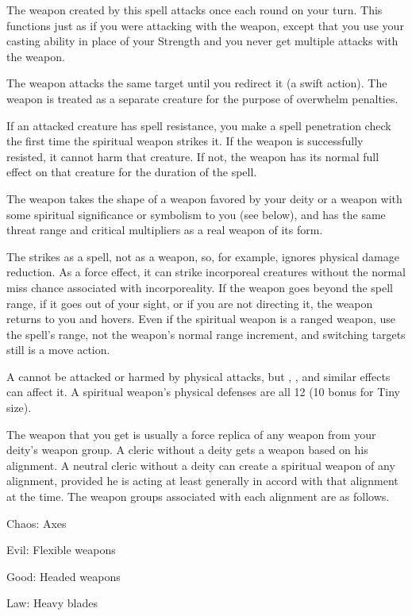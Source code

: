 \spellrng{\rngmed}
\spelldur{\durshort \dismissable}
\begin{spelleffect}
    The weapon created by this spell attacks once each round on your turn. This functions just as if you were attacking with the weapon, except that you use your casting ability in place of your Strength and you never get multiple attacks with the weapon.
    \par The weapon attacks the same target until you redirect it (a swift action). The weapon is treated as a separate creature for the purpose of overwhelm penalties.
    \par If an attacked creature has spell resistance, you make a spell penetration check the first time the spiritual weapon strikes it. If the weapon is successfully resisted, it cannot harm that creature. If not, the weapon has its normal full effect on that creature for the duration of the spell.
    \par The weapon takes the shape of a weapon favored by your deity or a weapon with some spiritual significance or symbolism to you (see below), and has the same threat range and critical multipliers as a real weapon of its form.
\end{spelleffect}
\begin{spellnotes}
    The  strikes as a spell, not as a weapon, so, for example, ignores physical damage reduction. As a force effect, it can strike incorporeal creatures without the normal miss chance associated with incorporeality. If the weapon goes beyond the spell range, if it goes out of your sight, or if you are not directing it, the weapon returns to you and hovers. Even if the spiritual weapon is a ranged weapon, use the spell's range, not the weapon's normal range increment, and switching targets still is a move action.
    \par A  cannot be attacked or harmed by physical attacks, but , , and similar effects can affect it. A spiritual weapon's physical defenses are all 12 (10 \add {} bonus for Tiny size).
    \par The weapon that you get is usually a force replica of any weapon from your deity's weapon group. A cleric without a deity gets a weapon based on his alignment. A neutral cleric without a deity can create a spiritual weapon of any alignment, provided he is acting at least generally in accord with that alignment at the time. The weapon groups associated with each alignment are as follows.
    \par Chaos: Axes
    \par Evil: Flexible weapons
    \par Good: Headed weapons
    \par Law: Heavy blades
\end{spellnotes}

